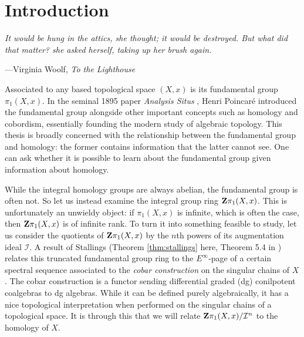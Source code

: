 \section{Introduction}
\epigraph{\emph{It would be hung in the attics, she thought; it would be destroyed. But what did that matter? she asked herself, taking up her brush again.}}{---Virginia Woolf, \emph{To the Lighthouse}}

\noindent Associated to any based topological space $(X,x)$ is its fundamental group $\pi_1(X,x)$. In the seminal 1895 paper \emph{Analysis Situs} \cite{poincare1895analysis}, Henri Poincar{\'e} introduced the fundamental group alongside other important concepts such as homology and cobordism, essentially founding the modern study of algebraic topology. This thesis is broadly concerned with the relationship between the fundamental group and homology: the former contains information that the latter cannot see. 
One can ask whether it is possible to learn about the fundamental group given information about homology. 

While the integral homology groups are always abelian, the fundamental group is often not. So let us instead examine the integral group ring $\mathbf{Z}\pi_1(X,x)$. This is unfortunately an unwieldy object: if $\pi_1(X,x)$ is infinite, which is often the case, then $\mathbf{Z}\pi_1(X,x)$ is of infinite rank. To turn it into something feasible to study, let us consider the quotients of $\mathbf{Z}\pi_1(X,x)$ by the $n$th powers of its augmentation ideal $\mathcal{I}$. A result of Stallings (Theorem \ref{thm:stallings} here, Theorem 5.4 in \cite{Stallings1975}) relates this truncated fundamental group ring to the $E^\infty$-page of a certain spectral sequence associated to the \emph{cobar construction} on the singular chains of $X$. The cobar construction is a functor sending differential graded (dg) conilpotent coalgebras to dg algebras. While it can be defined purely algebraically, it has a nice topological interpretation when performed on the singular chains of a topological space. It is through this that we will relate $\mathbf{Z}\pi_1(X,x)/\mathcal{I}^n$ to the homology of $X$. 
